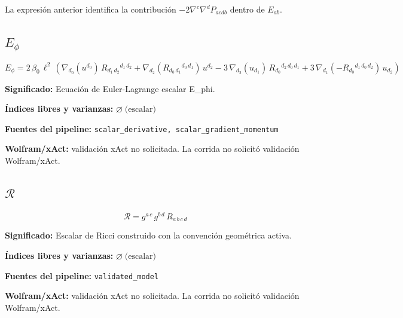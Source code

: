 \documentclass[11pt]{article}
\begin{document}
\par\vspace{0.8\baselineskip}\noindent
\begin{minipage}{\linewidth}
La expresión anterior identifica la contribución $-2\nabla^c\nabla^dP_{acdb}$ dentro de $E_{ab}$.\par
\end{minipage}
\subsection*{$ E_{\phi} $}
\begin{dmath*}[breakdepth={5}]
E_{\phi} = 2\,\beta_{0}\,{\ell}^{2}\,\left(\nabla_{d_{0}}\!\left(u{}^{d_{0}}\right)\,R{}_{d_{1}\,d_{2}}{}^{d_{1}\,d_{2}} + \nabla_{d_{2}}\!\left(R{}_{d_{0}\,d_{1}}{}^{d_{0}\,d_{1}}\right)\,u{}^{d_{2}} - 3\,\nabla_{d_{2}}\!\left(u{}_{d_{1}}\right)\,R{}_{d_{0}}{}^{d_{2}\,d_{0}\,d_{1}} + 3\,\nabla_{d_{1}}\!\left(-R{}_{d_{0}}{}^{d_{1}\,d_{0}\,d_{2}}\right)\,u{}_{d_{2}}\right)
\end{dmath*}
\par\vspace{1.2\baselineskip}\noindent
\begin{minipage}{\linewidth}
\textbf{Significado:} Ecuación de Euler-Lagrange escalar E\_phi.\par
\textbf{Índices libres y varianzas:} $ \varnothing\;\text{(escalar)} $\par
\textbf{Fuentes del pipeline:} \texttt{scalar\_derivative, scalar\_gradient\_momentum}\par
\textbf{Wolfram/xAct:} validación xAct no solicitada. La corrida no solicitó validación Wolfram/xAct.\par
\end{minipage}
\subsection*{$ \mathcal{R} $}
\begin{dmath*}[breakdepth={5}]
\mathcal{R} = g{}^{a\,c}\,g{}^{b\,d}\,R{}_{a\,b\,c\,d}
\end{dmath*}
\par\vspace{1.2\baselineskip}\noindent
\begin{minipage}{\linewidth}
\textbf{Significado:} Escalar de Ricci construido con la convención geométrica activa.\par
\textbf{Índices libres y varianzas:} $ \varnothing\;\text{(escalar)} $\par
\textbf{Fuentes del pipeline:} \texttt{validated\_model}\par
\textbf{Wolfram/xAct:} validación xAct no solicitada. La corrida no solicitó validación Wolfram/xAct.\par
\end{minipage}
\end{document}
